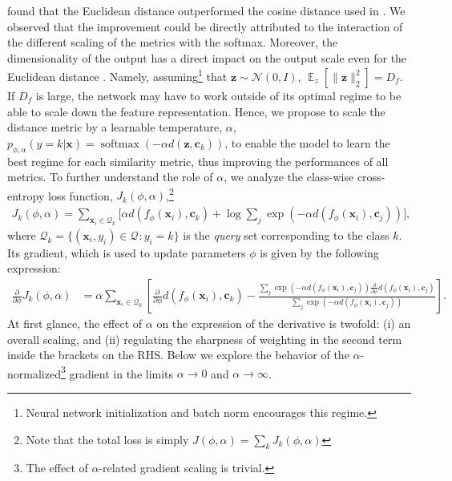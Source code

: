 \documentclass{article}
\renewcommand{\vec}[1]{\mathbf{#1}}
\newcommand{\query}[1]{\mathcal{Q}_{#1}}
\newcommand{\metric}{d}
\DeclareMathOperator{\E}{\mathbb{E}}
\DeclareMathOperator{\softmax}{softmax}
\begin{document}
\citet{snell2017prototypical} found that the Euclidean distance outperformed the cosine distance used in \citet{vinyals2016matching}. We observed that the improvement could be directly attributed to the interaction of the different scaling of the metrics with the softmax. Moreover, the dimensionality of the output has a direct impact on the output scale even for the Euclidean distance \citep{vaswani2017attention}. Namely, assuming\footnote{Neural network initialization and batch norm encourages this regime.} that $\vec{z} \sim \mathcal{N}(0, I)$, $\E_z[\lVert \vec{z} \rVert_2^2] = D_f$. If $D_f$ is large, the network may have to work outside of its optimal regime to be able to scale down the feature representation. Hence, we propose to scale the distance metric by a learnable temperature, $\alpha$, $p_{\phi,\alpha}(y=k|\vec{x})=\softmax(-\alpha d(\vec{z}, \mathbf{c}_k))$, to enable the model to learn the best regime for each similarity metric, thus improving the performances of all metrics. To further understand the role of $\alpha$, we analyze the class-wise cross-entropy loss function, $J_{k}(\phi,\alpha)$,\footnote{Note that the total loss is simply $J(\phi,\alpha) = \sum_{k} J_{k}(\phi,\alpha)$}
\begin{align} \label{eqn:softmax_with_alpha_cost_by_class}
    J_{k}(\phi,\alpha) = \sum_{\vec{x}_{i} \in \query{k}} \Big[ \alpha \metric(f_{\phi}(\vec{x}_{i}), \vec{c}_k)  + \log \sum_{j} \exp(-\alpha \metric(f_{\phi}(\vec{x}_i), \vec{c}_j)) \Big],
\end{align}
where $\query{k} = \{ (\vec{x}_i, y_i) \in \query{} : y_i = k \}$ is the \emph{query} set corresponding to the class $k$. Its gradient, which is used to update parameters $\phi$ is given by the following expression:
\begin{align} \label{eqn:softmax_with_alpha_total_derivative}
    \frac{\partial}{\partial\phi}J_k(\phi,\alpha) &= \alpha \sum_{\vec{x}_{i} \in \query{k}} \left[ \frac{\partial}{\partial\phi} \metric(f_{\phi}(\vec{x}_{i}), \vec{c}_k)  - \frac{\sum_{j} \exp(-\alpha \metric(f_{\phi}(\vec{x}_i), \vec{c}_j)) \frac{\partial}{\partial\phi} \metric(f_{\phi}(\vec{x}_{i}), \vec{c}_j)}{\sum_{j} \exp(-\alpha \metric(f_{\phi}(\vec{x}_i), \vec{c}_j))} \right].
\end{align}
At first glance, the effect of $\alpha$ on the expression of the derivative is twofold: (i) an overall scaling, and (ii) regulating the sharpness of weighting in the second term inside the brackets on the RHS. Below we explore the behavior of the $\alpha$-normalized\footnote{The effect of $\alpha$-related gradient scaling is trivial.}  gradient in the limits $\alpha \to 0$ and $\alpha \to \infty$. 
\end{document}
